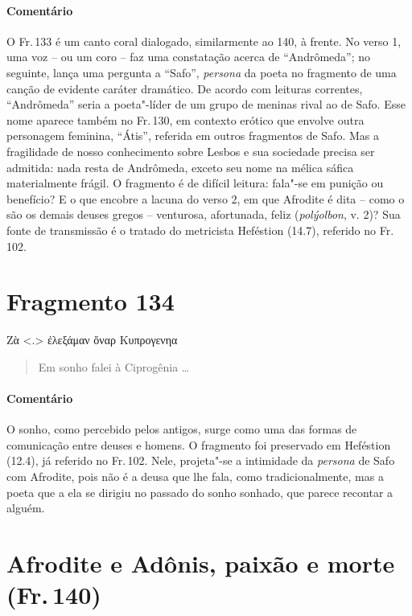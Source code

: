 {\paragraph{Comentário} O Fr.\,133 é um canto coral dialogado, similarmente ao 140, à frente. No verso 1, uma voz -- ou um coro -- faz uma constatação acerca de ``Andrômeda”; no seguinte,
lança uma pergunta a ``Safo”, \textit{persona }da poeta no fragmento de
uma canção de evidente caráter dramático. De acordo com leituras correntes,
``Andrômeda” seria a poeta"-líder de um grupo de
meninas rival ao de Safo. Esse nome aparece também no Fr.\,130, em contexto
erótico que envolve outra personagem feminina, “Átis”, referida em
outros fragmentos de Safo. Mas a fragilidade de nosso conhecimento sobre Lesbos
e sua sociedade precisa ser admitida: nada resta de Andrômeda, exceto seu nome
na mélica sáfica materialmente frágil. O fragmento é de difícil leitura:
fala"-se em punição ou benefício? E o que encobre a lacuna do verso 2, em que
Afrodite é dita -- como o são os demais deuses gregos -- venturosa, afortunada,
feliz (\textit{polýolbon}, v. 2)? Sua fonte de transmissão é o tratado do metricista Heféstion (14.7), referido
no Fr.\,102.}

\pagebreak

\section{Fragmento 134}

\begin{gkverse}
Ζὰ <.> ἐλεξάμαν ὄναρ Κυπρογενηα
\end{gkverse}

\begin{verse}
Em sonho falei à Ciprogênia \ldots{}
\end{verse}

{\paragraph{Comentário} O sonho, como percebido pelos antigos, surge como uma das formas de 
comunicação entre deuses e homens. O fragmento foi preservado em Heféstion (12.4), já
referido no Fr.\,102. Nele, projeta"-se a intimidade da \textit{persona} de Safo com Afrodite, pois não é a deusa que lhe fala, como tradicionalmente, mas a poeta que a ela se dirigiu no passado do sonho sonhado, que parece recontar a alguém.}


\pagebreak
\section{Afrodite e Adônis, paixão e morte (Fr.\,140)}

